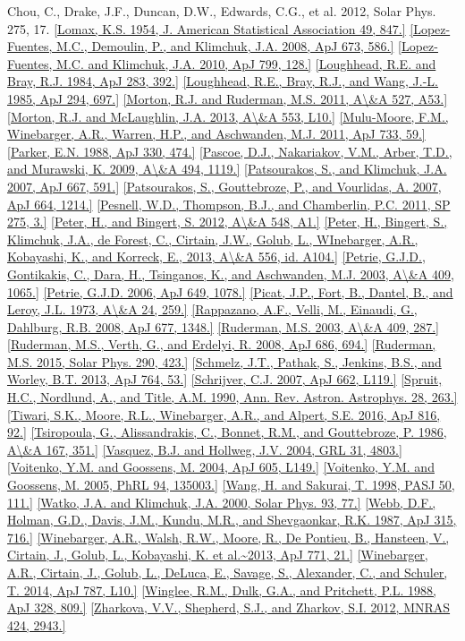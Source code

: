 \documentclass[10pt,preprint]{aastex}  %
\begin{document}
\begin{references}
{        Chou, C., Drake, J.F., Duncan, D.W., Edwards, C.G., et al.
        2012, Solar Phys. 275, 17.}
\ref{Lomax, K.S. 1954, J. American Statistical Association 49, 847.}
\ref{Lopez-Fuentes, M.C., Demoulin, P., and Klimchuk, J.A.
 	2008, ApJ 673, 586.}
\ref{Lopez-Fuentes, M.C. and Klimchuk, J.A. 2010, ApJ 799, 128.}
\ref{Loughhead, R.E. and Bray, R.J. 1984, ApJ 283, 392.} 
\ref{Loughhead, R.E., Bray, R.J., and Wang, J.-L. 1985, ApJ 294, 697.} 
\ref{Morton, R.J. and Ruderman, M.S. 2011, A\&A 527, A53.}
\ref{Morton, R.J. and McLaughlin, J.A. 2013, A\&A 553, L10.}
\ref{Mulu-Moore, F.M., Winebarger, A.R., Warren, H.P., and Aschwanden, M.J.
	2011, ApJ 733, 59.}
\ref{Parker, E.N. 1988, ApJ 330, 474.}
\ref{Pascoe, D.J., Nakariakov, V.M., Arber, T.D., and Murawski, K.
	2009, A\&A 494, 1119.}
\ref{Patsourakos, S., and Klimchuk, J.A. 2007, ApJ 667, 591.}
\ref{Patsourakos, S., Gouttebroze, P., and Vourlidas, A. 2007, ApJ 664, 1214.}
\ref{Pesnell, W.D., Thompson, B.J., and Chamberlin, P.C. 2011, SP 275, 3.}
\ref{Peter, H., and Bingert, S. 2012, A\&A 548, A1.}
\ref{Peter, H., Bingert, S., Klimchuk, J.A., de Forest, C., Cirtain, J.W.,
	Golub, L., WInebarger, A.R., Kobayashi, K., and Korreck, E.,
	2013, A\&A 556, id. A104.}
\ref{Petrie, G.J.D., Gontikakis, C., Dara, H., Tsinganos, K., 
	and Aschwanden, M.J. 2003, A\&A 409, 1065.}
\ref{Petrie, G.J.D. 2006, ApJ 649, 1078.}
\ref{Picat, J.P., Fort, B., Dantel, B., and Leroy, J.L. 1973,
	A\&A 24, 259.}
\ref{Rappazano, A.F., Velli, M., Einaudi, G., Dahlburg, R.B.
	2008, ApJ 677, 1348.}
\ref{Ruderman, M.S. 2003, A\&A 409, 287.}
\ref{Ruderman, M.S., Verth, G., and Erdelyi, R. 2008, ApJ 686, 694.}
\ref{Ruderman, M.S. 2015, Solar Phys. 290, 423.}
\ref{Schmelz, J.T., Pathak, S., Jenkins, B.S., and Worley, B.T.
 	2013, ApJ 764, 53.}
\ref{Schrijver, C.J. 2007, ApJ 662, L119.}
\ref{Spruit, H.C., Nordlund, A., and Title, A.M. 1990,
	Ann. Rev. Astron. Astrophys. 28, 263.}
\ref{Tiwari, S.K., Moore, R.L., Winebarger, A.R., and Alpert, S.E.
	2016, ApJ 816, 92.}
\ref{Tsiropoula, G., Alissandrakis, C., Bonnet, R.M., and Gouttebroze, P.
	1986, A\&A 167, 351.}
\ref{Vasquez, B.J. and Hollweg, J.V. 2004, GRL 31, 4803.}
\ref{Voitenko, Y.M. and Goossens, M. 2004, ApJ 605, L149.}
\ref{Voitenko, Y.M. and Goossens, M. 2005, PhRL 94, 135003.}
\ref{Wang, H. and Sakurai, T. 1998, PASJ 50, 111.}
\ref{Watko, J.A. and Klimchuk, J.A. 2000, Solar Phys. 93, 77.}
\ref{Webb, D.F., Holman, G.D., Davis, J.M., Kundu, M.R., and
	Shevgaonkar, R.K. 1987, ApJ 315, 716.}
\ref{Winebarger, A.R., Walsh, R.W., Moore, R., De Pontieu, B., Hansteen, V.,
	Cirtain, J., Golub, L., Kobayashi, K. et al.~2013, ApJ 771, 21.} 
\ref{Winebarger, A.R., Cirtain, J., Golub, L., DeLuca, E., Savage, S., 
	Alexander, C., and Schuler, T. 2014, ApJ 787, L10.}
\ref{Winglee, R.M., Dulk, G.A., and Pritchett, P.L. 1988, ApJ 328, 809.}
\ref{Zharkova, V.V., Shepherd, S.J., and Zharkov, S.I.
 	2012, MNRAS 424, 2943.}
\end{references}
\clearpage
\end{document}
